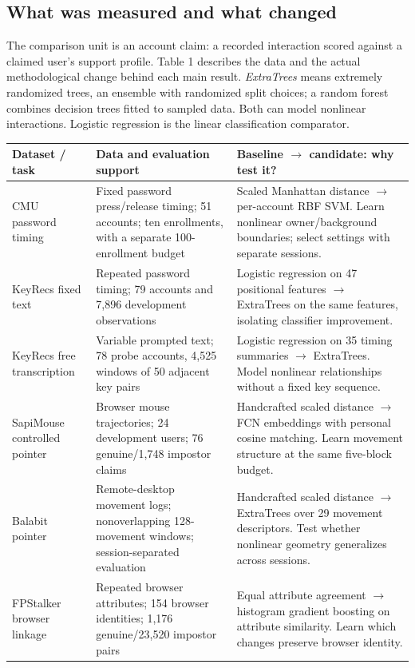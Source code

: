\documentclass[10pt,a4paper]{article}
\newcommand{\smalltable}{\fontsize{8.5}{10.4}\selectfont}
\begin{document}
\subsection{What was measured and what changed}
The comparison unit is an account claim: a recorded interaction scored against a claimed user's support profile. Table 1 describes the data and the actual methodological change behind each main result. \emph{ExtraTrees} means extremely randomized trees, an ensemble with randomized split choices; a random forest combines decision trees fitted to sampled data. Both can model nonlinear interactions. Logistic regression is the linear classification comparator.
\begin{center}\smalltable
\begin{tabularx}{\linewidth}{@{}>{\raggedright\arraybackslash}p{30mm}>{\raggedright\arraybackslash}p{52mm}>{\raggedright\arraybackslash}X@{}}
\toprule
\textbf{Dataset / task} & \textbf{Data and evaluation support} & \textbf{Baseline $\rightarrow$ candidate: why test it?}\\\midrule
CMU password timing & Fixed password press/release timing; 51 accounts; ten enrollments, with a separate 100-enrollment budget & Scaled Manhattan distance $\rightarrow$ per-account RBF SVM. Learn nonlinear owner/background boundaries; select settings with separate sessions.\\
KeyRecs fixed text & Repeated password timing; 79 accounts and 7,896 development observations & Logistic regression on 47 positional features $\rightarrow$ ExtraTrees on the same features, isolating classifier improvement.\\
KeyRecs free transcription & Variable prompted text; 78 probe accounts, 4,525 windows of 50 adjacent key pairs & Logistic regression on 35 timing summaries $\rightarrow$ ExtraTrees. Model nonlinear relationships without a fixed key sequence.\\
SapiMouse controlled pointer & Browser mouse trajectories; 24 development users; 76 genuine/1,748 impostor claims & Handcrafted scaled distance $\rightarrow$ FCN embeddings with personal cosine matching. Learn movement structure at the same five-block budget.\\
Balabit pointer & Remote-desktop movement logs; nonoverlapping 128-movement windows; session-separated evaluation & Handcrafted scaled distance $\rightarrow$ ExtraTrees over 29 movement descriptors. Test whether nonlinear geometry generalizes across sessions.\\
FPStalker browser linkage & Repeated browser attributes; 154 browser identities; 1,176 genuine/23,520 impostor pairs & Equal attribute agreement $\rightarrow$ histogram gradient boosting on attribute similarity. Learn which changes preserve browser identity.\\

\end{tabularx}
\end{center}
\end{document}
